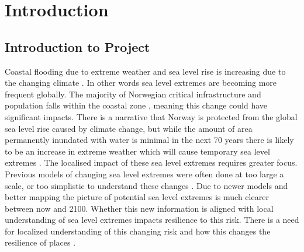 




\chapter{Introduction}
\section{Introduction to Project}
Coastal flooding due to extreme weather and sea level rise is increasing due to the changing climate \cite{hoffken_effects_2020}.  In other words sea level extremes are becoming more frequent globally. The majority of Norwegian critical infrastructure and population falls within the coastal zone \cite{engebakken_construction_2022}, meaning this change could have significant impacts. There is a narrative that Norway is protected from the global sea level rise caused by climate change, but while the amount of area permanently inundated with water is minimal in the next 70 years there is likely to be an increase in extreme weather which will cause temporary sea level extremes \cite{aunan_strong_2008}. The localised impact of these sea level extremes requires greater focus. Previous models of changing sea level extremes were often done at too large a scale, or too simplistic to understand these changes \cite{hoffken_effects_2020}. Due to newer models and better mapping the picture of potential sea level extremes is much clearer between now and 2100. Whether this new information is aligned with local understanding of sea level extremes impacts resilience to this risk\cite{setten_we_2019}.  There is a need for localized understanding of this changing risk and how this changes the resilience of places \cite{rod_integrated_2012}.
